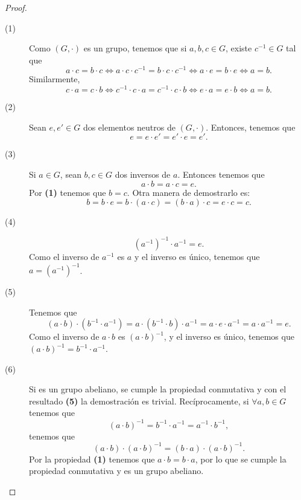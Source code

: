 \begin{proof}
\begin{description}
\item[(1)] Como $\displaystyle \left(G, \cdot\right) $ es un grupo, tenemos que si $\displaystyle a, b, c \in G $, existe $\displaystyle c^{-1} \in G $ tal que 
	\[a \cdot c = b \cdot c \iff a \cdot c \cdot c^{-1} = b \cdot c \cdot c^{-1} \iff a \cdot e = b \cdot e \iff a = b .\]
Similarmente, 
\[c \cdot a = c \cdot b \iff c^{-1} \cdot c \cdot a = c^{-1} \cdot c \cdot b \iff e \cdot a = e \cdot b \iff a = b .\]
\item[(2)] Sean $\displaystyle e, e' \in G $ dos elementos neutros de $\displaystyle \left(G, \cdot\right) $. Entonces, tenemos que 
	\[ e = e \cdot e' = e' \cdot e = e' .\]
\item[(3)] Si $\displaystyle a \in G $, sean $\displaystyle b, c \in G $ dos inversos de $\displaystyle a $. Entonces tenemos que 
	\[a \cdot b = a \cdot c = e .\]
Por \textbf{(1)} tenemos que $\displaystyle b = c $. Otra manera de demostrarlo es:
\[b = b \cdot e = b \cdot \left(a \cdot c\right) = \left(b \cdot a \right) \cdot c = e \cdot c = c .\]
\item[(4)] 
	\[\left(a^{-1}\right)^{-1} \cdot a^{-1} = e .\]
Como el inverso de $\displaystyle a^{-1} $ es $\displaystyle a $ y el inverso es único, tenemos que $\displaystyle a = \left(a^{-1}\right)^{-1} $. 
\item[(5)] Tenemos que 
	\[\left(a \cdot b\right) \cdot \left(b^{-1} \cdot a^{-1}\right) = a \cdot \left(b^{-1} \cdot b\right) \cdot a^{-1} = a \cdot e \cdot a^{-1} = a \cdot a^{-1} = e .\]
	Como el inverso de $\displaystyle a \cdot b $ es $\displaystyle \left(a \cdot b\right)^{-1} $, y el inverso es único, tenemos que $\displaystyle \left(a \cdot b\right)^{-1} = b^{-1} \cdot a^{-1} $.
\item[(6)] Si es un grupo abeliano, se cumple la propiedad conmutativa y con el resultado \textbf{(5)} la demostración es trivial. Recíprocamente, si $\displaystyle \forall a, b \in G $ tenemos que 
	\[\left(a \cdot b\right) ^{-1} = b^{-1} \cdot a^{-1} = a^{-1} \cdot b^{-1} ,\]
tenemos que 
\[ \left(a \cdot b\right) \cdot \left(a \cdot b\right)^{-1} = \left( b \cdot a\right) \cdot\left(a \cdot b\right)^{-1} .\]
Por la propiedad \textbf{(1)} tenemos que $\displaystyle a \cdot b = b \cdot a $, por lo que se cumple la propiedad conmutativa y es un grupo abeliano. 
\end{description}

\end{proof}

